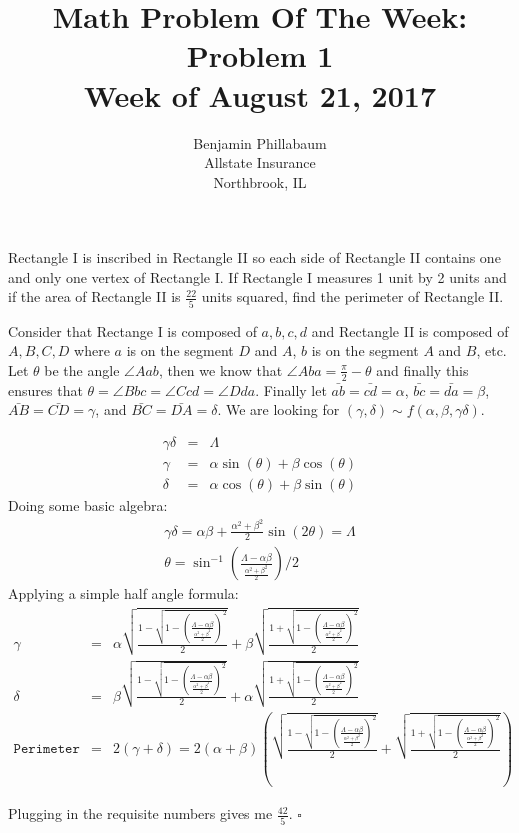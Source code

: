 \documentclass[11pt]{article}
\title{Math Problem Of The Week: Problem 1\\Week of August 21, 2017}
\author{Benjamin Phillabaum\\Allstate Insurance\\Northbrook, IL}
\begin{document}
\maketitle
\newpage

\begin{framed}
Rectangle I is inscribed in  Rectangle II so each side of Rectangle II contains one and only one vertex of Rectangle I. If Rectangle I measures 1 unit by 2 units and if the area of Rectangle II is $\frac{22}{5}$ units squared, find the perimeter of Rectangle II.
\end{framed}

Consider that Rectange I is composed of $a,b,c,d$ and Rectangle II is composed of $A,B,C,D$ where $a$ is on the segment $D$ and $A$, $b$ is on the segment $A$ and $B$, etc. Let $\theta$ be the angle $\angle Aab$, then we know that $\angle Aba = \frac{\pi}{2} - \theta$ and finally this ensures that $\theta = \angle Bbc = \angle Ccd = \angle Dda$. Finally let $\bar{ab} = \bar{cd} = \alpha$, $\bar{bc} = \bar{da} = \beta$, $\bar{AB} = \bar{CD} = \gamma$, and $\bar{BC} = \bar{DA} = \delta$. We are looking for $(\gamma,\delta) \sim f(\alpha,\beta,\gamma \delta)$.

\begin{eqnarray*}
\gamma \delta &=& \Lambda \\
\gamma &=& \alpha \sin(\theta) + \beta \cos(\theta) \\
\delta &=& \alpha \cos(\theta) + \beta \sin(\theta) 
\end{eqnarray*}
Doing some basic algebra:
\begin{eqnarray*}
\gamma \delta = \alpha \beta + \frac{\alpha^2+\beta^2}{2} \sin(2\theta) = \Lambda\\
\theta = \sin^{-1} (\frac{\Lambda - \alpha \beta}{\frac{\alpha^2+\beta^2}{2}})/2
\end{eqnarray*}
Applying a simple half angle formula:
\begin{eqnarray*}
\gamma &=& \alpha \sqrt{\frac{1-\sqrt{1- (\frac{\Lambda - \alpha \beta}{\frac{\alpha^2+\beta^2}{2}})^2}}{2}}+\beta \sqrt{\frac{1+\sqrt{1- (\frac{\Lambda - \alpha \beta}{\frac{\alpha^2+\beta^2}{2}})^2}}{2}}\\
\delta &=&\beta \sqrt{\frac{1-\sqrt{1- (\frac{\Lambda - \alpha \beta}{\frac{\alpha^2+\beta^2}{2}})^2}}{2}}+\alpha \sqrt{\frac{1+\sqrt{1- (\frac{\Lambda - \alpha \beta}{\frac{\alpha^2+\beta^2}{2}})^2}}{2}}\\
\texttt{Perimeter} &=& 2(\gamma+\delta) = 2(\alpha+\beta)\left( \sqrt{\frac{1-\sqrt{1- (\frac{\Lambda - \alpha \beta}{\frac{\alpha^2+\beta^2}{2}})^2}}{2}}+ \sqrt{\frac{1+\sqrt{1- (\frac{\Lambda - \alpha \beta}{\frac{\alpha^2+\beta^2}{2}})^2}}{2}}\right)
\end{eqnarray*}

Plugging in the requisite numbers gives me $\frac{42}{5}$.
$\square$
\end{document}
